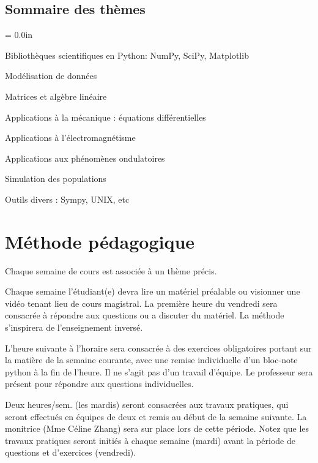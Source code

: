 \documentclass[10pt,usletter]{article}
\begin{document}
\subsection*{Sommaire des thèmes}
\begin{compactenum}[~~1.~]
\parskip = 0.0in
\item Bibliothèques scientifiques en Python: NumPy, SciPy, Matplotlib
\item Modélisation de données
\item Matrices et algèbre linéaire
\item Applications à la mécanique : équations différentielles
\item Applications à l'électromagnétisme
\item Applications aux phénomènes ondulatoires
\item Simulation des populations
\item Outils divers : Sympy, UNIX, etc
\end{compactenum}

\section{Méthode pédagogique}

\begin{compactenum}[1.~]
\item Chaque semaine de cours est associée à un thème précis.
\item Chaque semaine l'étudiant(e) devra lire un matériel préalable ou visionner une vidéo tenant lieu de cours magistral. La première heure du vendredi sera consacrée à répondre aux questions ou a discuter du matériel. La méthode s'inspirera de l'enseignement inversé.
\item L'heure suivante à l'horaire sera consacrée à des exercices obligatoires portant sur la matière de la semaine courante, avec une remise individuelle d'un bloc-note python à la fin de l'heure. Il ne s'agit pas d'un travail d'équipe. Le professeur sera présent pour répondre aux questions individuelles.
\item Deux heures/sem. (les mardis) seront consacrées aux travaux pratiques, qui seront effectués en équipes de deux et remis au début de la semaine suivante. La monitrice (Mme Céline Zhang) sera sur place lors de cette période. Notez que les travaux pratiques seront initiés à chaque semaine (mardi) avant la période de questions et d'exercices (vendredi).
\end{compactenum}
\end{document}

